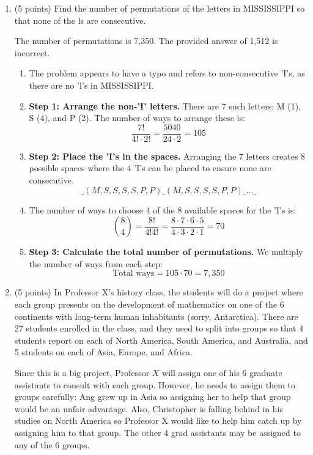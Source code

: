 \documentclass{article}
\begin{document}
\begin{enumerate}
  \item (5 points) Find the number of permutations of the letters in 
  MISSISSIPPI so that none of the ls are consecutive.
  \begin{answer}
    The number of permutations is 7,350. The provided answer of 1,512 is incorrect.
    \begin{enumerate}
      \item The problem appears to have a typo and refers to 
      non-consecutive 'I's, as there are no 'l's in MISSISSIPPI.
      \item \textbf{Step 1: Arrange the non-'I' letters.} There are 7 such 
      letters: M (1), S (4), and P (2). The number of ways to arrange these is:
      $$
      \frac{7!}{4! \cdot 2!} = \frac{5040}{24 \cdot 2} = 105
      $$
      \item \textbf{Step 2: Place the 'I's in the spaces.} Arranging the 
      7 letters creates 8 possible spaces where the 4 'I's can be placed 
      to ensure none are consecutive.
      $$
      \_ (M, S, S, S, S, P, P) \_ (M, S, S, S, S, P, P) \_ \dots \_
      $$
      \item The number of ways to choose 4 of the 8 available spaces 
      for the 'I's is:
      $$
      \binom{8}{4} = \frac{8!}{4! 4!} = \frac{8 \cdot 7 \cdot 6 \cdot 5}{4 \cdot 3 \cdot 2 \cdot 1} = 70
      $$
      \item \textbf{Step 3: Calculate the total number of permutations.} 
      We multiply the number of ways from each step:
      $$
      \text{Total ways} = 105 \cdot 70 = 7,350
      $$
    \end{enumerate}
  \end{answer}



  \newpage

  \item (5 points) In Professor X's history class, the students will do a 
  project where each group presents on the development of mathematics on 
  one of the 6 continents with long-term human inhabitants (sorry, Antarctica). 
  There are 27 students enrolled in the class, and they need to split into groups so that 4 students report on each of North America, South America, and Australia, and 5 students on each of Asia, Europe, and Africa.

  Since this is a big project, Professor $X$ will assign one of his 6 graduate assistants to consult with each group. However, he needs to assign them to groups carefully: Ang grew up in Asia so assigning her to help that group would be an unfair advantage. Also, Christopher is falling behind in his studies on North America so Professor X would like to help him catch up by assigning him to that group. The other 4 grad assistants may be assigned to any of the 6 groups.


\end{enumerate}
\end{document}
